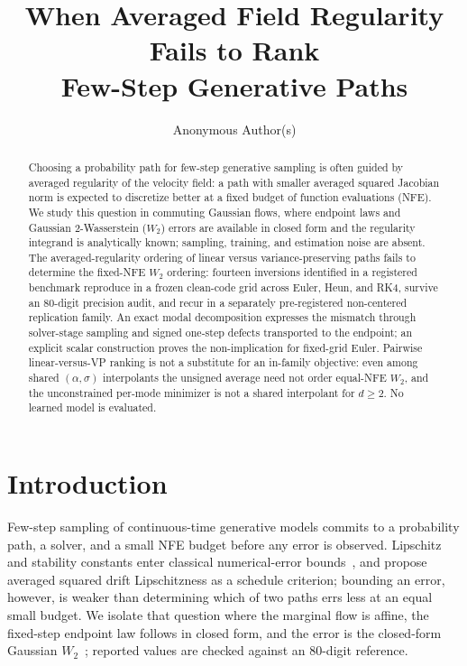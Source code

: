 \documentclass{article}
\title{When Averaged Field Regularity Fails to Rank\\ Few-Step Generative Paths}
\author{%
  Anonymous Author(s)\\
}
\newcommand{\wtwo}{W_2}
\begin{document}
\maketitle

\begin{abstract}
Choosing a probability path for few-step generative sampling is often
guided by averaged regularity of the velocity field: a path with smaller
averaged squared Jacobian norm is expected to discretize better at a
fixed budget of function evaluations (NFE). We study this question in
commuting Gaussian
flows, where endpoint laws and Gaussian 2-Wasserstein ($\wtwo$) errors
are available in closed form and the regularity integrand is analytically
known; sampling, training, and estimation noise are absent. The
averaged-regularity ordering of linear versus variance-preserving paths
fails to determine the fixed-NFE $\wtwo$ ordering: fourteen inversions
identified in a registered benchmark reproduce in a frozen clean-code
grid across Euler, Heun, and RK4, survive an 80-digit precision audit,
and recur in a separately pre-registered non-centered replication
family. An exact modal decomposition expresses the mismatch through solver-stage
sampling and signed one-step defects transported to the endpoint; an
explicit scalar construction proves the non-implication for fixed-grid
Euler. Pairwise linear-versus-VP ranking is not a substitute for an
in-family objective: even among shared $(\alpha,\sigma)$ interpolants the
unsigned average need not order equal-NFE $\wtwo$, and the unconstrained
per-mode minimizer is not a shared interpolant for $d\geq 2$. No learned
model is evaluated.
\end{abstract}

\section{Introduction}

Few-step sampling of continuous-time generative models commits to a
probability path, a solver, and a small NFE budget before any error is
observed. Lipschitz and stability constants enter classical
numerical-error bounds~\citep{hairer1993solving}, and
\citet{lipschitzguided2025} propose averaged squared drift Lipschitzness
as a schedule criterion; bounding an error, however, is weaker than
determining which of two paths errs less at an equal small budget. We
isolate that question where the marginal flow is affine, the fixed-step
endpoint law follows in closed form, and the error is the closed-form
Gaussian $\wtwo$~\citep{gelbrich1990formula}; reported values are
checked against an 80-digit reference.
\end{document}
